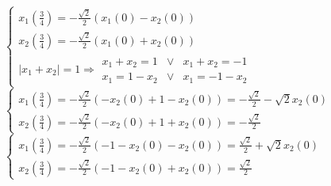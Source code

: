 $\begin{cases}
x_1(\frac34)=-\frac{\sqrt{2}}{2}(x_1(0)-x_2(0))\\
x_2(\frac34)=-\frac{\sqrt{2}}{2}(x_1(0)+x_2(0))\\
|x_1+x_2|=1\Rightarrow \begin{array}{ccc}x_1+x_2=1&\vee&x_1+x_2=-1 \\ x_1=1-x_2&\vee& x_1=-1-x_2\end{array}
\end{cases}$\\
$\begin{cases}
x_1(\frac34)=-\frac{\sqrt{2}}{2}(-x_2(0)+1-x_2(0))=-\frac{\sqrt{2}}{2}-\sqrt{2}x_2(0)\\
x_2(\frac34)=-\frac{\sqrt{2}}{2}(-x_2(0)+1+x_2(0))=-\frac{\sqrt{2}}{2}
\end{cases}$\\
$\begin{cases}
x_1(\frac34)=-\frac{\sqrt{2}}{2}(-1-x_2(0)-x_2(0))=\frac{\sqrt{2}}{2}+\sqrt{2}x_2(0)\\
x_2(\frac34)=-\frac{\sqrt{2}}{2}(-1-x_2(0)+x_2(0))=\frac{\sqrt{2}}{2}
\end{cases}$\\

\begin{figure}[!h]
\end{figure}


